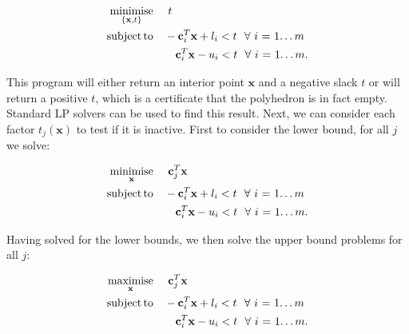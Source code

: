 \documentclass[twoside,11pt]{article}
\def\x{{\mathbf x}}
\def\c{{\mathbf c}}
\begin{document}
\begin{equation}
\label{eqn:lp0}
\begin{split}
\underset{\{\x,t\}}{\mathrm{minimise}} & ~~~~t   \\
\text{subject\thinspace to} & ~~~-\c_i^T\x + l_i  <  t ~~\forall~ \text{$i$ = 1{\ldots}$m$}\\
& ~~~~~~\c_i^T\x - u_i  <  t ~~\forall~ \text{$i$ = 1{\ldots}$m$}.
\end{split}
\end{equation}

This program will either return an interior point $\x$ and a negative slack $t$ or will return a positive $t$, which is a certificate that the polyhedron is in fact empty.  Standard LP solvers can be used to find this result.  Next, we can consider each factor $t_j(\x)$ to test if it is inactive.  First to consider the lower bound, for all $j$ we solve: 

\begin{equation}
\label{eqn:lp1}
\begin{split}
\underset{\x}{\mathrm{minimise}} & ~~~~\c_j^T\x   \\
\text{subject\thinspace to} & ~~~-\c_i^T\x + l_i  <  t ~~\forall~ \text{$i$ = 1{\ldots}$m$}\\
& ~~~~~~\c_i^T\x - u_i  <  t ~~\forall~ \text{$i$ = 1{\ldots}$m$}.
\end{split}
\end{equation}

\noindent Having solved for the lower bounds, we then solve the upper bound problems for all $j$: 

\begin{equation}
\label{eqn:lp2}
\begin{split}
\underset{\x}{\mathrm{maximise}} & ~~~~\c_j^T\x   \\
\text{subject\thinspace to} & ~~~-\c_i^T\x + l_i  <  t ~~\forall~ \text{$i$ = 1{\ldots}$m$}\\
& ~~~~~~\c_i^T\x - u_i  <  t ~~\forall~ \text{$i$ = 1{\ldots}$m$}.
\end{split}
\end{equation}
\end{document}
